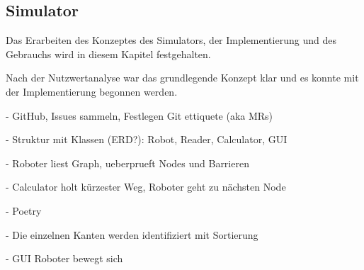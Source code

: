 \subsection{Simulator}

Das Erarbeiten des Konzeptes des Simulators, der Implementierung und des Gebrauchs wird in diesem Kapitel festgehalten.

Nach der Nutzwertanalyse war das grundlegende Konzept klar und es konnte mit der Implementierung begonnen werden.

- GitHub, Issues sammeln, Festlegen Git ettiquete (aka MRs)

- Struktur mit Klassen (ERD?): Robot, Reader, Calculator, GUI

- Roboter liest Graph, ueberprueft Nodes und Barrieren

- Calculator holt kürzester Weg, Roboter geht zu nächsten Node

- Poetry

- Die einzelnen Kanten werden identifiziert mit Sortierung

- GUI Roboter bewegt sich
